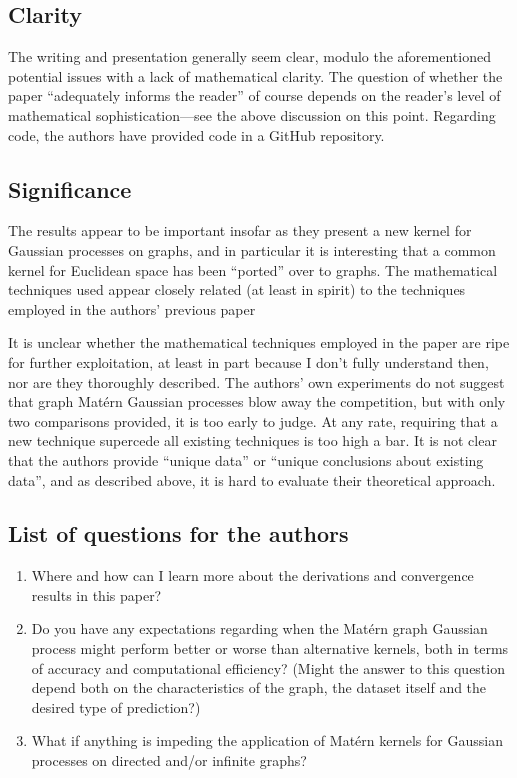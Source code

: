 \subsection{Clarity}

The writing and presentation generally seem clear, modulo the aforementioned potential issues with a lack of mathematical clarity. The question of whether the paper ``adequately informs the reader'' of course depends on the reader's level of mathematical sophistication---see the above discussion on this point. Regarding code, the authors have provided code in a GitHub repository.

\subsection{Significance}

The results appear to be important insofar as they present a new kernel for Gaussian processes on graphs, and in particular it is interesting that a common kernel for Euclidean space has been ``ported'' over to graphs. The mathematical techniques used appear closely related (at least in spirit) to the techniques employed in the authors' previous paper \cite{NEURIPS2020_92bf5e62}

It is unclear whether the mathematical techniques employed in the paper are ripe for further exploitation, at least in part because I don't fully understand then, nor are they thoroughly described. The authors' own experiments do not suggest that graph Mat\'{e}rn Gaussian processes blow away the competition, but with only two comparisons provided, it is too early to judge. At any rate, requiring that a new technique supercede all existing techniques is too high a bar. It is not clear that the authors provide ``unique data'' or ``unique conclusions about existing data'', and as described above, it is hard to evaluate their theoretical approach.

\subsection{List of questions for the authors}

\begin{enumerate}
    \item Where and how can I learn more about the derivations and convergence results in this paper?
    \item Do you have any expectations regarding when the Mat\'{e}rn graph Gaussian process might perform better or worse than alternative kernels, both in terms of accuracy and computational efficiency? (Might the answer to this question depend both on the characteristics of the graph, the dataset itself and the desired type of prediction?)
    \item What if anything is impeding the application of Mat\'{e}rn kernels for Gaussian processes on directed and/or infinite graphs?
\end{enumerate}


